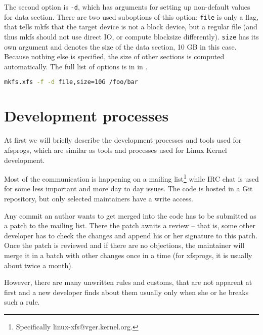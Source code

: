 The second option is {\tt -d}, which has arguments for setting up
non-default values for data section.  There are two used suboptions of this
option: {\tt file} is only a flag, that tells mkfs that the target device
is not a block device, but a regular file (and thus mkfs should not use
direct IO, or compute blocksize differently). {\tt size} has its own
argument and denotes the size of the data section, 10 GB in this case.
Because nothing else is specified, the size of other sections is computed
automatically. The full list of options is in  in
.

\begin{lstlisting}[frame=none, basicstyle=\footnotesize\ttfamily,
language=Bash, numbers=none, numberstyle=\tiny\color{black},caption=
{An example of mkfs.xfs invocation.},
label={lst:refactoring:example}]
mkfs.xfs -f -d file,size=10G /foo/bar
\end{lstlisting}

\section{Development processes}\label{chap:refactoring:processes}

At first we will briefly describe the development processes and tools used for
xfsprogs, which are similar as tools and processes used for Linux Kernel
development.

Most of the communication is happening on a mailing
list\footnote{Specifically linux-xfs@vger.kernel.org.} while IRC chat is
used for some less
important and more day to day issues. The code is hosted in a Git repository,
but only selected maintainers have a write access.

Any commit an author wants to get merged into the code has to be submitted
as a patch to the mailing list. There the patch awaits a review -- that is,
some other developer has to check the changes and append his or her
signature to this patch. Once the patch is reviewed and if there are no
objections, the maintainer will merge it in a batch with other changes once
in a time (for xfsprogs, it is usually about twice a month).

However, there are many unwritten rules and customs, that are not apparent
at first and a new developer finds about them usually only when she or he
breaks such a rule.

